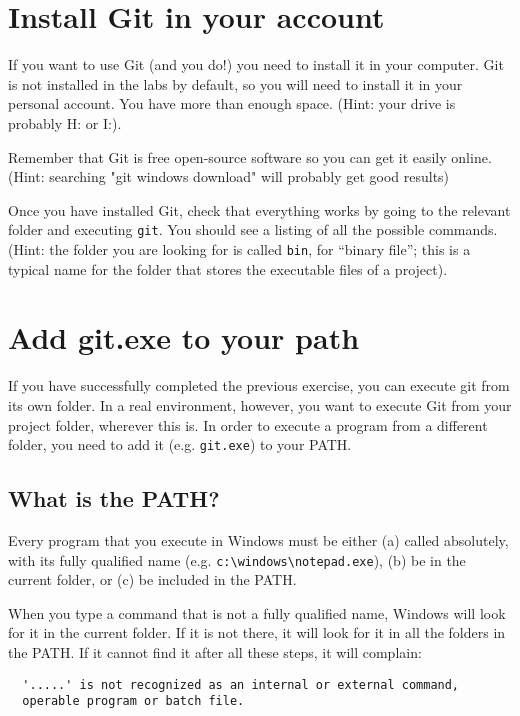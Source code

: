 \documentclass{article}
\begin{document}
\section{Install Git in your account}
\label{sec:install-git-your}

If you want to use Git (and you do!) you need to install it in your
computer. Git is not installed in the labs by default, so you will
need to install it in your personal account. You have more than enough
space. (Hint: your drive is probably H: or I:).

Remember that Git is free open-source software so you can get it
easily online. (Hint: searching "git windows download" will
probably get good results)

Once you have installed Git, check that everything works by going to
the relevant folder and executing \verb+git+. You should see a listing
of all the possible commands. (Hint: the folder you are looking for is
called \verb+bin+, for ``binary file''; this is a typical name for the
folder that stores the executable files of a project). 

\section{Add git.exe to your path}
\label{sec:add-git.exe-your}

If you have successfully completed the previous exercise, you can
execute git from its own folder. In a real environment, however, you
want to execute Git from your project folder, wherever this is. In
order to execute a program from a different folder, you need to add it
(e.g. \verb+git.exe+) to your PATH. 

\subsection{What is the PATH?}
\label{sec:what-path}

Every program that you execute in Windows must be either (a) called
absolutely, with its fully qualified name
(e.g. \verb+c:\windows\notepad.exe+), (b) be in the current folder, 
or (c) be included in the PATH.

When you type a command that is not a fully qualified name, Windows
will look for it in the current folder. If it is not there, it will
look for it in all the folders in the PATH. If it cannot find it after
all these steps, it will complain:

\begin{verbatim}
  '.....' is not recognized as an internal or external command,
  operable program or batch file.
\end{verbatim}
\end{document}

